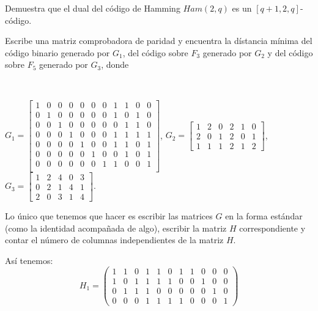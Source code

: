 \begin{problem}[15] Demuestra que el dual del código de Hamming $Ham(2,q)$
es un $[q+1,2,q]$-código.
\solution


\end{problem}


\begin{problem}[16]  Escribe una matriz comprobadora de paridad y encuentra la
dístancia mínima del código binario generado por $G_1$, del código
sobre $ F_3$ generado por $G_2$ y del código sobre $ F_5$ generado
por $G_3$, donde

\

$G_1=\left[\begin{array}{ccccccccccc}
1&0&0&0&0&0&0& 1&1&0&0\\
0&1&0&0&0&0&0& 1&0&1&0\\
0&0&1&0&0&0&0& 0&1&1&0\\
0&0&0&1&0&0&0& 1&1&1&1\\
0&0&0&0&1&0&0& 1&1&0&1\\
0&0&0&0&0&1&0& 0&1&0&1\\
0&0&0&0&0&0&1& 1&0&0&1\\
\end{array}\right]$,
\hspace{0.2cm}
$ G_2=\left[\begin{array}{cccccc}
1&2&0&2&1&0\\2&0&1&2&0&1\\1&1&1&2&1&2\end{array}\right]$,
\hspace{0.2cm}
$
G_3=\left[\begin{array}{ccccc} 1&2&4&0&3\\0&2&1&4&1\\2&0&3&1&4
\end{array}\right].$
\solution


Lo único que tenemos que hacer es escribir las matrices $G$ en la forma estándar (como la identidad acompañada de algo), escribir la matriz $H$ correspondiente y contar el número de columnas independientes de la matriz $H$.

Así tenemos:
\[H_1=\left(\begin{array}{ccccccccccc}
1 & 1 & 0 & 1 & 1 & 0 & 1 & 1 & 0 & 0 & 0\\
1 & 0 & 1 & 1 & 1 & 1 & 0 & 0 & 1 & 0 & 0\\
0 & 1 & 1 & 1 & 0 & 0 & 0 & 0 & 0 & 1 & 0\\
0 & 0 & 0 & 1 & 1 & 1 & 1 & 0 & 0 & 0 & 1
\end{array}\right)\]


\end{problem}
